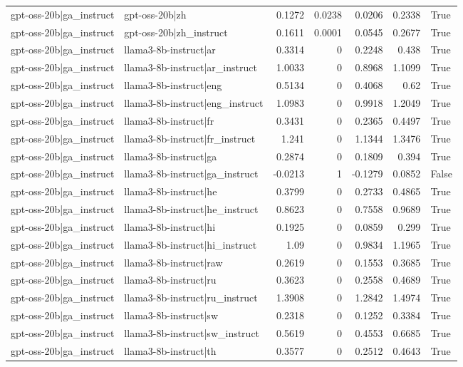 \begin{table}
\begin{tabular}{l l r r r r l}
gpt-oss-20b|ga_instruct & gpt-oss-20b|zh & 0.1272 & 0.0238 & 0.0206 & 0.2338 & True \\
gpt-oss-20b|ga_instruct & gpt-oss-20b|zh_instruct & 0.1611 & 0.0001 & 0.0545 & 0.2677 & True \\
gpt-oss-20b|ga_instruct & llama3-8b-instruct|ar & 0.3314 & 0 & 0.2248 & 0.438 & True \\
gpt-oss-20b|ga_instruct & llama3-8b-instruct|ar_instruct & 1.0033 & 0 & 0.8968 & 1.1099 & True \\
gpt-oss-20b|ga_instruct & llama3-8b-instruct|eng & 0.5134 & 0 & 0.4068 & 0.62 & True \\
gpt-oss-20b|ga_instruct & llama3-8b-instruct|eng_instruct & 1.0983 & 0 & 0.9918 & 1.2049 & True \\
gpt-oss-20b|ga_instruct & llama3-8b-instruct|fr & 0.3431 & 0 & 0.2365 & 0.4497 & True \\
gpt-oss-20b|ga_instruct & llama3-8b-instruct|fr_instruct & 1.241 & 0 & 1.1344 & 1.3476 & True \\
gpt-oss-20b|ga_instruct & llama3-8b-instruct|ga & 0.2874 & 0 & 0.1809 & 0.394 & True \\
gpt-oss-20b|ga_instruct & llama3-8b-instruct|ga_instruct & -0.0213 & 1 & -0.1279 & 0.0852 & False \\
gpt-oss-20b|ga_instruct & llama3-8b-instruct|he & 0.3799 & 0 & 0.2733 & 0.4865 & True \\
gpt-oss-20b|ga_instruct & llama3-8b-instruct|he_instruct & 0.8623 & 0 & 0.7558 & 0.9689 & True \\
gpt-oss-20b|ga_instruct & llama3-8b-instruct|hi & 0.1925 & 0 & 0.0859 & 0.299 & True \\
gpt-oss-20b|ga_instruct & llama3-8b-instruct|hi_instruct & 1.09 & 0 & 0.9834 & 1.1965 & True \\
gpt-oss-20b|ga_instruct & llama3-8b-instruct|raw & 0.2619 & 0 & 0.1553 & 0.3685 & True \\
gpt-oss-20b|ga_instruct & llama3-8b-instruct|ru & 0.3623 & 0 & 0.2558 & 0.4689 & True \\
gpt-oss-20b|ga_instruct & llama3-8b-instruct|ru_instruct & 1.3908 & 0 & 1.2842 & 1.4974 & True \\
gpt-oss-20b|ga_instruct & llama3-8b-instruct|sw & 0.2318 & 0 & 0.1252 & 0.3384 & True \\
gpt-oss-20b|ga_instruct & llama3-8b-instruct|sw_instruct & 0.5619 & 0 & 0.4553 & 0.6685 & True \\
gpt-oss-20b|ga_instruct & llama3-8b-instruct|th & 0.3577 & 0 & 0.2512 & 0.4643 & True \\

\end{tabular}
\end{table}
